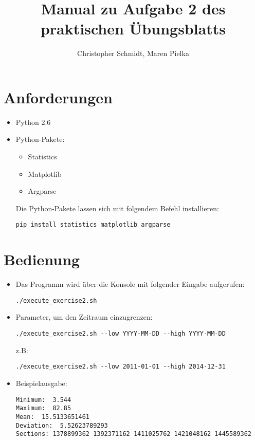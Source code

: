 \documentclass[runningheads]{article}
\begin{document}
\title{Manual zu Aufgabe 2 des praktischen Übungsblatts}
\author{Christopher Schmidt, Maren Pielka}


\maketitle

\section{Anforderungen}
\begin{itemize}
\item Python 2.6
\item Python-Pakete:
\begin{itemize}
\item Statistics
\item Matplotlib
\item Argparse
\end{itemize}
Die Python-Pakete lassen sich mit folgendem Befehl installieren:
\begin{lstlisting} 
pip install statistics matplotlib argparse
\end{lstlisting}
\end{itemize}

\section{Bedienung}
\begin{itemize}
\item Das Programm wird über die Konsole mit folgender Eingabe aufgerufen: \\
\begin{lstlisting}
./execute_exercise2.sh
\end{lstlisting}
\item Parameter, um den Zeitraum einzugrenzen:
\begin{lstlisting}
./execute_exercise2.sh --low YYYY-MM-DD --high YYYY-MM-DD
\end{lstlisting}
z.B:
\begin{lstlisting}
./execute_exercise2.sh --low 2011-01-01 --high 2014-12-31
\end{lstlisting}
\item Beispielausgabe:
\begin{lstlisting}
Minimum:  3.544
Maximum:  82.85
Mean:  15.5133651461
Deviation:  5.52623789293
Sections: 1378899362 1392371162 1411025762 1421048162 1445589362
\end{lstlisting}
\end{itemize}
\end{document}
